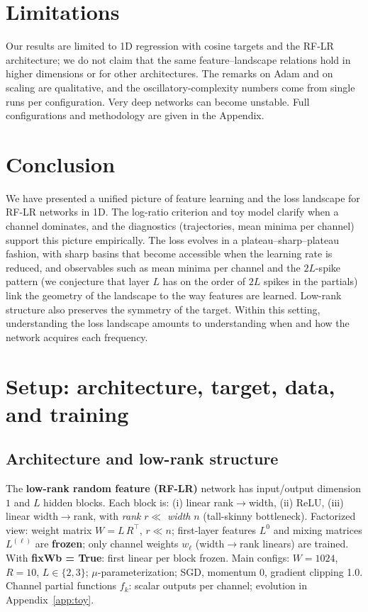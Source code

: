 \documentclass{article}
\theoremstyle{plain}
\theoremstyle{definition}
\begin{document}
\section{Limitations}
\label{sec:limitations}

Our results are limited to 1D regression with cosine targets and the RF-LR architecture; we do not claim that the same feature--landscape relations hold in higher dimensions or for other architectures. The remarks on Adam and on scaling are qualitative, and the oscillatory-complexity numbers come from single runs per configuration. Very deep networks can become unstable. Full configurations and methodology are given in the Appendix.

\section{Conclusion}
\label{sec:conclusion}

We have presented a unified picture of feature learning and the loss landscape for RF-LR networks in 1D. The log-ratio criterion and toy model clarify when a channel dominates, and the diagnostics (trajectories, mean minima per channel) support this picture empirically. The loss evolves in a plateau--sharp--plateau fashion, with sharp basins that become accessible when the learning rate is reduced, and observables such as mean minima per channel and the $2L$-spike pattern (we conjecture that layer $L$ has on the order of $2L$ spikes in the partials) link the geometry of the landscape to the way features are learned. Low-rank structure also preserves the symmetry of the target. Within this setting, understanding the loss landscape amounts to understanding when and how the network acquires each frequency.




\appendix
\section{Setup: architecture, target, data, and training}
\label{app:setup}

\subsection{Architecture and low-rank structure}
The \textbf{low-rank random feature (RF-LR)} network has input/output dimension $1$ and $L$ hidden blocks. Each block is: (i) linear rank$\to$width, (ii) ReLU, (iii) linear width$\to$rank, with \emph{rank} $r \ll$ \emph{width} $n$ (tall-skinny bottleneck). Factorized view: weight matrix $W = L\,R^\top$, $r \ll n$; first-layer features $L^0$ and mixing matrices $L^{(\ell)}$ are \textbf{frozen}; only channel weights $w_\ell$ (width$\to$rank linears) are trained. With \textbf{fixWb = True}: first linear per block frozen. Main configs: $W=1024$, $R=10$, $L \in \{2,3\}$; $\mu$-parameterization; SGD, momentum $0$, gradient clipping 1.0. Channel partial functions $f_k$: scalar outputs per channel; evolution in Appendix~\ref{app:toy}.
\end{document}
